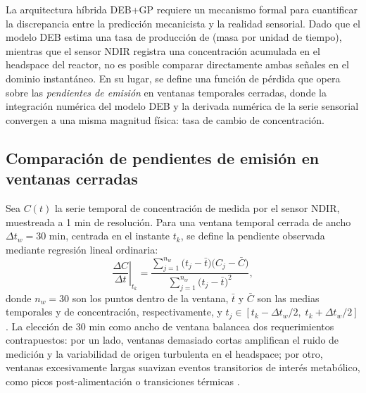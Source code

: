 La arquitectura híbrida DEB+GP requiere un mecanismo formal para cuantificar la discrepancia entre la predicción mecanicista y la realidad sensorial. Dado que el modelo DEB estima una tasa de producción de  (masa por unidad de tiempo), mientras que el sensor NDIR registra una concentración acumulada en el headspace del reactor, no es posible comparar directamente ambas señales en el dominio instantáneo. En su lugar, se define una función de pérdida que opera sobre las \emph{pendientes de emisión} en ventanas temporales cerradas, donde la integración numérica del modelo DEB y la derivada numérica de la serie sensorial convergen a una misma magnitud física: tasa de cambio de concentración.

\subsection{Comparación de pendientes de emisión en ventanas cerradas}
\label{subsec:cap4_pendientes_ventanas}

Sea $C(t)$ la serie temporal de concentración de  medida por el sensor NDIR, muestreada a \num{1} min de resolución. Para una ventana temporal cerrada de ancho $\Delta t_w = \num{30}$ min, centrada en el instante $t_k$, se define la pendiente observada mediante regresión lineal ordinaria:
\begin{equation}
    \label{eq:cap4_pendiente_sensor}
    \left.\frac{\Delta C}{\Delta t}\right|_{t_k} =
    \frac{\sum_{j=1}^{n_w}\bigl(t_j - \bar{t}\bigr)\bigl(C_j - \bar{C}\bigr)}
    {\sum_{j=1}^{n_w}\bigl(t_j - \bar{t}\bigr)^{2}},
\end{equation}
donde $n_w = \num{30}$ son los puntos dentro de la ventana, $\bar{t}$ y $\bar{C}$ son las medias temporales y de concentración, respectivamente, y $t_j \in [t_k - \Delta t_w/2,\; t_k + \Delta t_w/2]$. La elección de \num{30} min como ancho de ventana balancea dos requerimientos contrapuestos: por un lado, ventanas demasiado cortas amplifican el ruido de medición y la variabilidad de origen turbulenta en el headspace; por otro, ventanas excesivamente largas suavizan eventos transitorios de interés metabólico, como picos post-alimentación o transiciones térmicas \parencite{rossiEstimatingDynamicsGreenhouse2024}.

